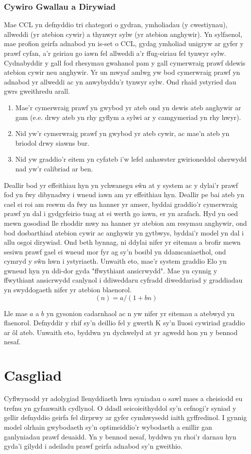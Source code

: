         \subsubsection{Cywiro Gwallau a Dirywiad}
Mae CCL yn defnyddio tri chategori o gydran, ymholiadau (y cwestiynau), allweddi (yr atebion cywir) a thynwyr sylw (yr atebion anghywir). Yn sylfaenol, mae profion geirfa adnabod yn is-set o CCL, gydag ymholiad unigryw ar gyfer y prawf cyfan, a'r geiriau go iawn fel allweddi a'r ffug-eiriau fel tynwyr sylw. Cydnabyddir y gall fod rhesymau gwahanol pam y gall cymerwraig prawf ddewis atebion cywir neu anghywir. Yr un mwyaf amlwg yw bod cymerwraig prawf yn adnabod yr allweddi ac yn anwybyddu'r tynwyr sylw. Ond rhaid ystyried dau gwrs gweithredu arall.
\begin{enumerate}
    \item Mae'r cymerwraig prawf yn gwybod yr ateb ond yn dewis ateb anghywir ar gam (e.e. drwy ateb yn rhy gyflym a sylwi ar y camgymeriad yn rhy hwyr).
    \item Nid yw'r cymerwraig prawf yn gwybod yr ateb cywir, ac mae'n ateb yn briodol drwy siawns bur.
    \item Nid yw graddio'r eitem yn cyfateb i'w lefel anhawster gwirioneddol oherwydd nad yw'r calibriad ar ben.
\end{enumerate}
Deallir bod yr effeithiau hyn yn ychwanegu sŵn at y system ac y dylai'r prawf fod yn fwy dibynadwy i wneud iawn am yr effeithiau hyn. Deallir pe bai ateb yn cael ei roi am reswm da fwy na hanner yr amser, byddai graddio'r cymerwraig prawf yn dal i gydgyfeirio tuag at ei werth go iawn, er yn arafach. Hyd yn oed mewn gosodiad lle rhoddir mwy na hanner yr atebion am resymau anghywir, ond bod dosbarthiad atebion cywir ac anghywir yn gytbwys, byddai'r model yn dal i allu osgoi dirywiad. Ond beth bynnag, ni ddylai nifer yr eitemau a brofir mewn sesiwn prawf gael ei wneud mor fyr ag sy'n bosibl yn ddamcaniaethol, ond cymryd y sŵn hwn i ystyriaeth. Unwaith eto, mae'r system graddio Elo yn gwneud hyn yn ddi-dor gyda "ffwythiant ansicrwydd". Mae \cite{pelanek_applications_2016} yn cynnig y ffwythiant ansicrwydd canlynol i ddiweddaru cyfradd diweddariad y graddiadau yn swyddogaeth nifer yr atebion blaenorol.
\begin{equation}
    (n)=a/(1 + bn)
    \label{uncertainty-function}
\end{equation}

Lle mae $a$ a $b$ yn gysonion cadarnhaol ac n yw nifer yr eitemau a atebwyd yn flaenorol. Defnyddir y rhif sy'n deillio fel y gwerth K sy'n lluosi cywiriad graddio ar ôl ateb. Unwaith eto, byddwn yn dychwelyd at yr agwedd hon yn y bennod nesaf.

\section{Casgliad}
Cyflwynodd yr adolygiad llenyddiaeth hwn syniadau o sawl maes a cheisiodd eu trefnu yn gyfanwaith cydlynol. O ddadl seicoieithyddol sy'n cefnogi'r syniad y gellir defnyddio geirfa fel dirprwy ar gyfer cymhwysedd iaith gyffredinol. I gynnig model olrhain gwybodaeth sy'n optimeiddio'r wybodaeth a enillir gan ganlyniadau prawf deuaidd. Yn y bennod nesaf, byddwn yn rhoi'r darnau hyn gyda'i gilydd i adeiladu prawf geirfa adnabod sy'n gweithio.